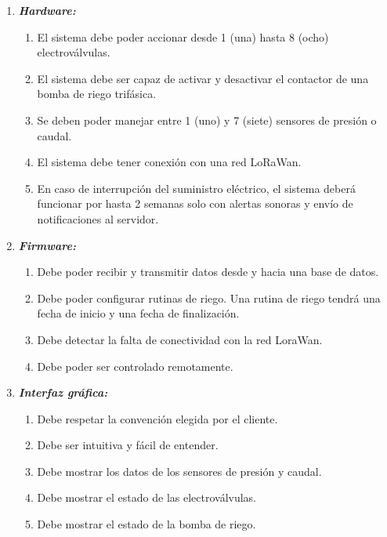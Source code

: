 \documentclass[11pt]{charter}
\begin{document}
\begin{enumerate}
	\item \textbf{\textit{Hardware:}}
	\begin{enumerate}
		\item El sistema debe poder accionar desde 1 (una) hasta 8 (ocho) 			  	electroválvulas.
		\item El sistema debe ser capaz de activar y desactivar el contactor de una bomba de riego trifásica.
		\item Se deben poder manejar entre 1 (uno) y 7 (siete) sensores de presión o caudal.
		\item El sistema debe tener conexión con una red LoRaWan.
		\item En caso de interrupción del suministro eléctrico, el sistema deberá funcionar por hasta 2 semanas solo con alertas sonoras y envío de notificaciones al servidor.
	\end{enumerate}		
	
	\item \textbf{\textit{Firmware:}}
	\begin{enumerate}
		\item Debe poder recibir y transmitir datos desde y hacia una base de datos.
		\item Debe poder configurar rutinas de riego. Una rutina de riego tendrá una fecha de inicio y una fecha de finalización.
		\item Debe detectar la falta de conectividad con la red LoraWan.
		\item Debe poder ser controlado remotamente. 
	\end{enumerate}
	
	\item \textbf{\textit{Interfaz gráfica:}}
	\begin{enumerate}
		\item Debe respetar la convención elegida por el cliente.
		\item Debe ser intuitiva y fácil de entender.		
		\item Debe mostrar los datos de los sensores de presión y caudal.
		\item Debe mostrar el estado de las electroválvulas. 
		\item Debe mostrar el estado de la bomba de riego.
	\end{enumerate}

	
\end{enumerate}
\end{document}
